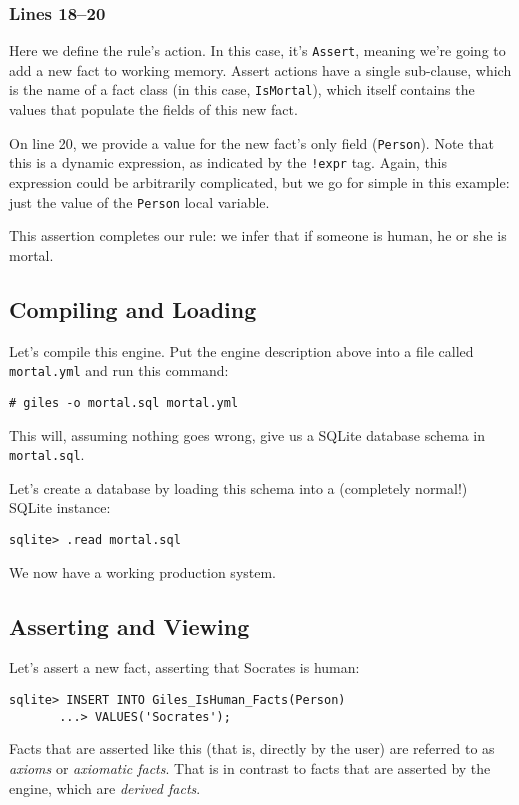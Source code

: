 \documentclass[letterpaper,10pt]{article}
\begin{document}
\subsubsection*{Lines 18--20}
Here we define the rule's action.
In this case, it's \texttt{Assert}, meaning we're going to add a new fact to working memory.
Assert actions have a single sub-clause, which is the name of a fact class (in this case, \texttt{IsMortal}), which itself contains the values that populate the fields of this new fact.

On line 20, we provide a value for the new fact's only field (\texttt{Person}).
Note that this is a dynamic expression, as indicated by the \texttt{!expr} tag.
Again, this expression could be arbitrarily complicated, but we go for simple in this example: just the value of the \texttt{Person} local variable.

This assertion completes our rule: we infer that if someone is human, he or she is mortal.

\subsection{Compiling and Loading}
Let's compile this engine.
Put the engine description above into a file called \texttt{mortal.yml} and run this command:
\begin{lstlisting}[frame=none,numbers=none]
    # giles -o mortal.sql mortal.yml
\end{lstlisting}
This will, assuming nothing goes wrong, give us a SQLite database schema in \texttt{mortal.sql}.

Let's create a database by loading this schema into a (completely normal!) SQLite instance:
\begin{lstlisting}[frame=none,numbers=none]
    sqlite> .read mortal.sql
\end{lstlisting}
We now have a working production system.

\subsection{Asserting and Viewing}
Let's assert a new fact, asserting that Socrates is human:
\begin{lstlisting}[frame=none,numbers=none]
    sqlite> INSERT INTO Giles_IsHuman_Facts(Person)
       ...> VALUES('Socrates');
\end{lstlisting}
Facts that are asserted like this (that is, directly by the user) are referred to as \emph{axioms} or \emph{axiomatic facts}.
That is in contrast to facts that are asserted by the engine, which are \emph{derived facts}.
\end{document}
